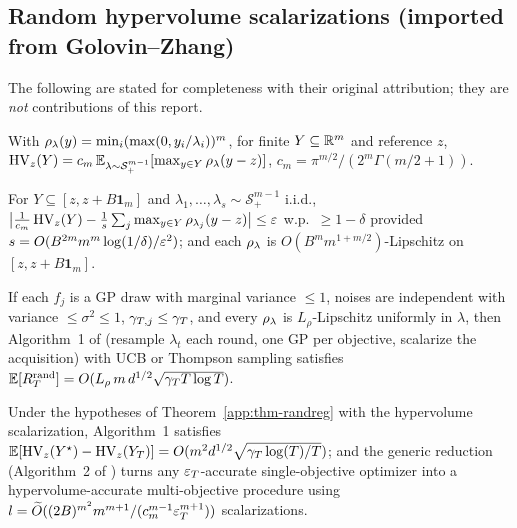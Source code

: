 \subsection{Random hypervolume scalarizations (imported from Golovin--Zhang)}

The following are stated for completeness with their original attribution; they
are \emph{not} contributions of this report.

\begin{lemma}
\label{app:lem-hvid}
With $\rho_\lambda(y)=\min_i(\max(0,y_i/\lambda_i))^m$, for finite
$Y\subseteq\mathbb{R}^m$ and reference $z$,
$\operatorname{HV}_z(Y)=c_m\,\mathbb{E}_{\lambda\sim\mathcal S_+^{m-1}}[\max_{y\in Y}\rho_\lambda(y-z)]$,
$c_m=\pi^{m/2}/(2^m\Gamma(m/2+1))$.
\end{lemma}

\begin{lemma}
\label{app:lem-hvconc}
For $Y\subseteq[z,z+B\mathbf 1_m]$ and $\lambda_1,\dots,\lambda_s\sim\mathcal S_+^{m-1}$
i.i.d., $\bigl|\tfrac1{c_m}\operatorname{HV}_z(Y)-\tfrac1s\sum_j\max_{y\in Y}\rho_{\lambda_j}(y-z)\bigr|\le\varepsilon$
w.p.\ $\ge1-\delta$ provided $s=O(B^{2m}m^m\log(1/\delta)/\varepsilon^2)$; and each
$\rho_\lambda$ is $O(B^m m^{1+m/2})$-Lipschitz on $[z,z+B\mathbf 1_m]$.
\end{lemma}

\begin{theorem}
\label{app:thm-randreg}
If each $f_j$ is a GP draw with marginal variance $\le1$, noises are independent
with variance $\le\sigma^2\le1$, $\gamma_{T,j}\le\gamma_T$, and every $\rho_\lambda$
is $L_\rho$-Lipschitz uniformly in $\lambda$, then Algorithm~1 of
\cite{golovin2020} (resample $\lambda_t$ each round, one GP per objective, scalarize
the acquisition) with UCB or Thompson sampling satisfies
$\mathbb{E}[R_T^{\mathrm{rand}}]=O(L_\rho\,m\,d^{1/2}\sqrt{\gamma_T T\log T})$.
\end{theorem}

\begin{theorem}
\label{app:thm-hvreg}
Under the hypotheses of Theorem~\ref{app:thm-randreg} with the hypervolume
scalarization, Algorithm~1 satisfies
$\mathbb{E}[\operatorname{HV}_z(Y^\star)-\operatorname{HV}_z(Y_T)]=O(m^2 d^{1/2}\sqrt{\gamma_T\log(T)/T})$; and the
generic reduction (Algorithm~2 of \cite{golovin2020}) turns any $\varepsilon_T$-accurate
single-objective optimizer into a hypervolume-accurate multi-objective procedure
using $l=\widetilde O((2B)^{m^2}m^{m+1}/(c_m^{m-1}\varepsilon_T^{m+1}))$ scalarizations.
\end{theorem}

